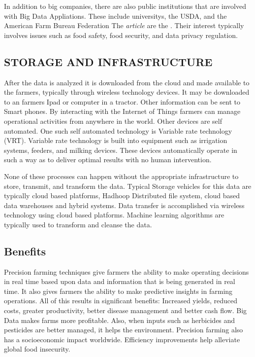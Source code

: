 \documentclass[sigconf]{acmart}
\begin{document}
In addition to big companies, there are also public institutions that are involved with Big Data Appliations. These include universitys, the USDA, and the American Farm Bureau Federation The \textit{article} are the \cite{article1}. Their interest typically involves issues such as food safety, food security, and data privacy regulation. 

\subsection{STORAGE AND INFRASTRUCTURE}

After the data is analyzed it is downloaded from the cloud and made available to the farmers, typically through wireless technology devices. It may be downloaded to an farmers Ipad or computer in a tractor. Other information can be sent to Smart phones. By interacting with the Internet of Things farmers can manage operational activities from anywhere in the world. Other devices are self automated. One such self automated technology is Variable rate technology (VRT). Variable rate technology is built into equipment such as irrigation systems, feeders, and milking devices. These devices automatically operate in such a way as to deliver optimal results with no human intervention.

None of these processes can happen without the appropriate infrastructure to store, transmit, and transform the data. Typical Storage vehicles for this data are typically cloud based platforms, Hadhoop Distributed file system, cloud based data warehouses and hybrid systems.
Data transfer is accomplished via wireless technology using cloud based platforms. Machine learning algorithms are typically used to transform and cleanse the data. \cite {article}

\subsection {Benefits}

Precision farming techniques give farmers the ability to make operating decisions in real time based upon data and information that is being generated in real time. It also gives farmers the ability to make predictive insights in farming operations. All of this results in significant benefits: Increased yields, reduced costs, greater productivity, better disease management and better cash flow. Big Data makes farms more profitable. Also, when inputs such as herbicides and pesticides are better managed, it helps the environment. Precision farming also has a socioeconomic impact worldwide. Efficiency improvements help alleviate global food insecurity.
\end{document}
